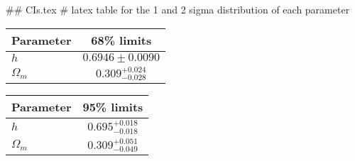 ## CIs.tex
# latex table for the 1 and 2 sigma distribution of each parameter

\begin{tabular} { l  c}
 Parameter &  68\% limits\\
\hline
{\boldmath$h              $} & $0.6946\pm 0.0090          $\\
{\boldmath$\Omega_m       $} & $0.309^{+0.024}_{-0.028}   $\\
\hline
\end{tabular}

\begin{tabular} { l  c}
 Parameter &  95\% limits\\
\hline
{\boldmath$h              $} & $0.695^{+0.018}_{-0.018}   $\\
{\boldmath$\Omega_m       $} & $0.309^{+0.051}_{-0.049}   $\\
\hline
\end{tabular}
